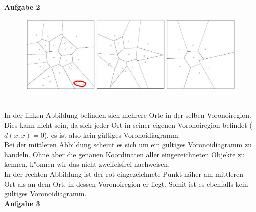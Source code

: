 \documentclass{article}
\begin{document}
\textbf{Aufgabe 2}\\
\begin{figure}[h]
\includegraphics[width=\textwidth]{a2}
\end{figure}\\
In der linken Abbildung befinden sich mehrere Orte in der selben Voronoiregion. Dies kann nicht sein, da sich jeder Ort in seiner eigenen Voronoiregion befindet ($d(x,x)=0$), es ist also kein g\"ultiges Voronoidiagramm. \\Bei der mittleren Abbildung scheint es sich um ein g\"ultiges Voronoidiagramm zu handeln. Ohne aber die genauen Koordinaten aller eingezeichneten Objekte zu kennen, k"onnen wir das nicht zweifelsfrei nachweisen.\\In der rechten Abbildung ist der rot eingezeichnete Punkt n\"aher am mittleren Ort als an dem Ort, in dessen Voronoiregion er liegt. Somit ist es ebenfalls kein g\"ultiges Voronoidiagramm.\\
\textbf{Aufgabe 3}
\end{document}
